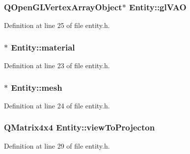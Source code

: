 \subsubsection[{gl\+V\+A\+O}]{\setlength{\rightskip}{0pt plus 5cm}Q\+Open\+G\+L\+Vertex\+Array\+Object$\ast$ Entity\+::gl\+V\+A\+O\hspace{0.3cm}{\ttfamily [protected]}}\label{class_entity_aaddc09c82caf2a17d745af5283771eac}


Definition at line 25 of file entity.\+h.

\hypertarget{class_entity_adbbe41659ac87bbed15c53e6101292e8}{}
\subsubsection[{material}]{$\ast$ Entity\+::material\hspace{0.3cm}{\ttfamily [protected]}}\label{class_entity_adbbe41659ac87bbed15c53e6101292e8}


Definition at line 23 of file entity.\+h.

\hypertarget{class_entity_ab346a9ce19733368f64f9109fb290ff1}{}
\subsubsection[{mesh}]{$\ast$ Entity\+::mesh\hspace{0.3cm}{\ttfamily [protected]}}\label{class_entity_ab346a9ce19733368f64f9109fb290ff1}


Definition at line 24 of file entity.\+h.

\hypertarget{class_entity_adddbfb9b19b765cb9674ad95fe9f22ce}{}
\subsubsection[{view\+To\+Projecton}]{\setlength{\rightskip}{0pt plus 5cm}Q\+Matrix4x4 Entity\+::view\+To\+Projecton\hspace{0.3cm}{\ttfamily [protected]}}\label{class_entity_adddbfb9b19b765cb9674ad95fe9f22ce}


Definition at line 29 of file entity.\+h.

\hypertarget{class_entity_ad9ec1327cacd74787dd951ff4389ca15}{}
